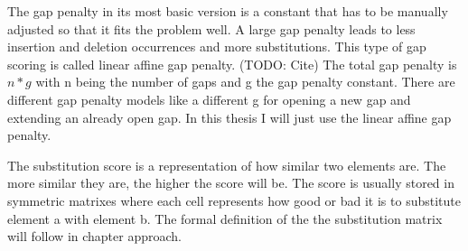 The gap penalty in its most basic version is a constant that has to be manually adjusted so that it fits the problem well. 
A large gap penalty leads to less insertion and deletion occurrences and more substitutions.
This type of gap scoring is called linear affine gap penalty. (TODO: Cite)
The total gap penalty is $n*g$ with n being the number of gaps and g the gap penalty constant. 
There are different gap penalty models like a different g for opening a new gap and extending an already open gap. 
In this thesis I will just use the linear affine gap penalty. 

The substitution score is a representation of how similar two elements are. The more similar they are, the higher the score will be.
The score is usually stored in symmetric matrixes where each cell represents how good or bad it is to substitute element a with element b. 
The formal definition of the the substitution matrix will follow in chapter approach.
\begin{figure}
	\label{fig:submatexample}
\end{figure}
